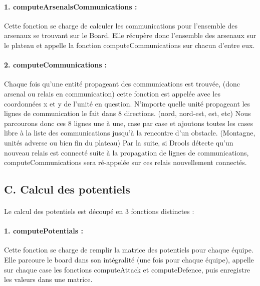 \documentclass[12pt]{article}
\begin{document}
		\paragraph{1. computeArsenalsCommunications : }
		Cette fonction se charge de calculer les communications pour l'ensemble des arsenaux se trouvant sur le Board.
		Elle récupère donc l'ensemble des arsenaux sur le plateau et appelle la fonction computeCommunications sur chacun d'entre eux.
		
		\paragraph{2. computeCommunications : }
		Chaque fois qu'une entité propageant des communications est trouvée, (donc arsenal ou relais en communication) cette fonction est appelée
		avec les coordonnées x et y de l'unité en question.
		N'importe quelle unité propageant les lignes de communication le fait dans 8 directions. (nord, nord-est, est, etc)
		Nous parcourons donc ces 8 lignes une à une, case par case et ajoutons toutes les cases libre à la liste des communications jusqu'à
		la rencontre d'un obstacle. (Montagne, unités adverse ou bien fin du plateau)
		Par la suite, si Drools détecte qu'un nouveau relais est connecté suite à la propagation de lignes de communications, computeCommunications
		sera ré-appelée sur ces relais nouvellement connectés.
		
		\subsection{C. Calcul des potentiels}
		
		\paragraph{}
		Le calcul des potentiels est découpé en 3 fonctions distinctes :
		
		\paragraph{1. computePotentials : }
		Cette fonction se charge de remplir la matrice des potentiels pour chaque équipe.
		Elle parcoure le board dans son intégralité (une fois pour chaque équipe), appelle sur chaque case les fonctions computeAttack et 
		computeDefence, puis enregistre les valeurs dans une matrice.
		
\end{document}
